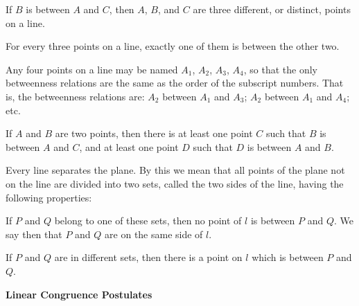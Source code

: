 \documentclass[11pt]{book}
\theoremstyle{bkplain}
\theoremstyle{XIplainnote}
\theoremstyle{bkplain}
\theoremstyle{bkplain}
\newcommand{\APPsub}[1]{%
  \par\medskip\begin{center}\bfseries\small #1\end{center}\par\nopagebreak}
\begin{document}
\begin{applist}[resume]
\item If $B$ is between $A$ and $C$, then $A$, $B$, and $C$ are three
      different, or distinct, points on a line.
\item For every three points on a line, exactly one of them is between the
      other two.
\item Any four points on a line may be named $A_1$, $A_2$, $A_3$, $A_4$, so
      that the only betweenness relations are the same as the order of the
      subscript numbers. That is, the betweenness relations are: $A_2$
      between $A_1$ and $A_3$; $A_2$ between $A_1$ and $A_4$; etc.
\item If $A$ and $B$ are two points, then there is at least one point $C$
      such that $B$ is between $A$ and $C$, and at least one point $D$ such
      that $D$ is between $A$ and $B$.
\item Every line separates the plane. By this we mean that all points of
      the plane not on the line are divided into two sets, called the two
      sides of the line, having the following properties:
      \begin{applist}
      \item If $P$ and $Q$ belong to one of these sets, then no point of
            $l$ is between $P$ and $Q$. We say then that $P$ and $Q$ are on
            the same side of $l$.
      \item If $P$ and $Q$ are in different sets, then there is a point on
            $l$ which is between $P$ and $Q$.
      \end{applist}
\end{applist}

\APPsub{Linear Congruence Postulates}
\end{document}
